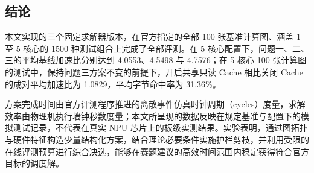 \documentclass[anonymous,notoc]{gmcm2026}
\begin{document}
\subsection{结论}

本文实现的三个固定求解器版本，在官方指定的全部 100 张基准计算图、涵盖 1 至 5 核心的 1500 种测试组合上完成了全部评测。在 5 核心配置下，问题一、二、三的平均基线加速比分别达到 4.0553、4.5498 与 4.7576；在 5 核心 100 张计算图的测试中，保持问题三方案不变的前提下，开启共享只读 Cache 相比关闭 Cache 的成对平均加速比为 1.0829，平均字节命中率为 31.36\%。

方案完成时间由官方评测程序推进的离散事件仿真时钟周期（cycles）度量，求解效率由物理机执行墙钟秒数度量；本文所呈现的数据反映在规定基准与配置下的模拟测试记录，不代表在真实 NPU 芯片上的板级实测结果。实验表明，通过图拓扑与硬件特征构造少量结构化方案，结合理论必要条件实施护栏剪枝，并利用受限的在线评测预算进行综合决选，能够在赛题建议的高效时间范围内稳定获得符合官方目标的调度解。
\end{document}
